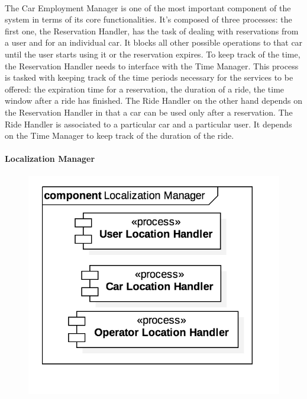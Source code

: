 		\paragraph{} The Car Employment Manager is one of the most important component of the system in terms of its core functionalities. It's composed of three processes: the first one, the Reservation Handler, has the task of dealing with reservations from a user and for an individual car. It blocks all other possible operations to that car until the user starts using it or the reservation expires. To keep track of the time, the Reservation Handler needs to interface with the Time Manager. This process is tasked with keeping track of the time periods necessary for the services to be offered: the expiration time for a reservation, the duration of a ride, the time window after a ride has finished. 
		The Ride Handler on the other hand depends on the Reservation Handler in that a car can be used only after a reservation. The Ride Handler is associated to a particular car and a particular user. It depends on the Time Manager to keep track of the duration of the ride. 
\FloatBarrier

	
		
		\paragraph{Localization Manager}
			\begin{figure}[h]
				\includegraphics[scale=0.4, center]{img/component_diagrams/05_localization_manager.png}
			\end{figure}
			

